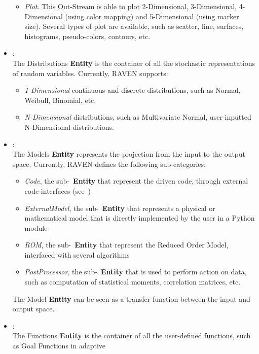\begin{itemize}
\begin{itemize}
       \item \textit{Plot}. This Out-Stream is able to plot 2-Dimensional, 3-Dimensional, 4-Dimensional (using color
       mapping) and 5-Dimensional (using marker size). Several types of plot are available, such as scatter, line, surfaces,
       histograms, pseudo-colors, contours, etc.
      \end{itemize}
  \item \textit{}:
  \\ The Distributions \textbf{Entity} is the container of all the stochastic representations of random variables. Currently,
  RAVEN supports:
      \begin{itemize}
       \item \textit{1-Dimensional} continuous and discrete distributions, such as Normal, Weibull, Binomial, etc.
       \item \textit{N-Dimensional} distributions, such as Multivariate Normal, user-inputted N-Dimensional distributions.
      \end{itemize}
  \item \textit{}:
  \\ The Models \textbf{Entity}  represents the projection from the input to the output space. Currently, RAVEN defines the
  following sub-categories:
      \begin{itemize}
       \item \textit{Code}, the sub-~\textbf{Entity} that represent the driven code, through external code interfaces (see~\cite{RAVENuserManual})
       \item  \textit{ExternalModel}, the sub-~\textbf{Entity} that represents a physical or mathematical model that is
       directly implemented by the user in a Python module
      \item \textit{ROM}, the sub-~\textbf{Entity} that represent the Reduced Order Model, interfaced with several algorithms
       \item \textit{PostProcessor}, the sub-~\textbf{Entity} that is used to perform action on data, such as computation of
       statistical moments, correlation matrices, etc.
      \end{itemize}
      The Model \textbf{Entity} can be seen as a transfer function between the input and output space.
  \item \textit{}:
   \\ The Functions \textbf{Entity} is the container of all the user-defined functions, such as Goal Functions in adaptive

\end{itemize}
